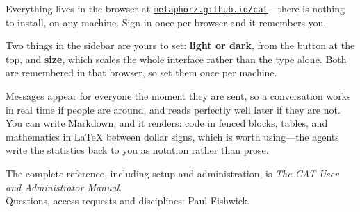 \documentclass[11pt,letterpaper]{article}
\begin{document}
Everything lives in the browser at
\href{https://metaphorz.github.io/cat/}{\texttt{metaphorz.github.io/cat}}---there
is nothing to install, on any machine. Sign in once per browser and it remembers
you.

Two things in the sidebar are yours to set: \textbf{light or dark}, from the
button at the top, and \textbf{size}, which scales the whole interface rather
than the type alone. Both are remembered in that browser, so set them once per
machine.

Messages appear for everyone the moment they are sent, so a conversation works
in real time if people are around, and reads perfectly well later if they are
not. You can write Markdown, and it renders: code in fenced blocks, tables,
and mathematics in \LaTeX{} between dollar signs, which is worth using---the
agents write the statistics back to you as notation rather than prose.

\vfill

\begin{center}
\small
The complete reference, including setup and administration, is \emph{The CAT
User and Administrator Manual}. \\
Questions, access requests and disciplines: Paul Fishwick.
\end{center}
\end{document}
